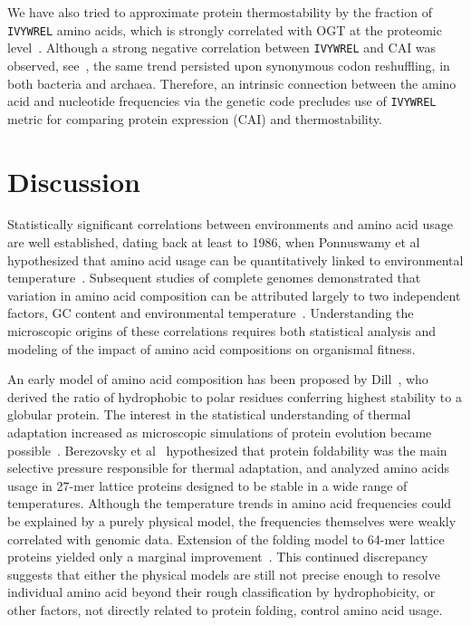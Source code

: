 \documentclass[10pt,letterpaper]{article}
\begin{document}
We have also tried to approximate protein thermostability by the fraction of \texttt{IVYWREL} amino acids, which is strongly correlated with OGT at the proteomic level~\cite{Zeldovich2007Protein}. Although a strong negative correlation between \texttt{IVYWREL} and CAI was observed, see~, the same trend persisted upon synonymous codon reshuffling, in both bacteria and archaea. Therefore, an intrinsic connection between the amino acid and nucleotide frequencies via the genetic code precludes use of \texttt{IVYWREL} metric for comparing protein expression (CAI) and thermostability.

\section*{Discussion}


Statistically significant correlations between environments and amino acid usage are well established, dating back at least to 1986, when Ponnuswamy et al hypothesized that amino acid usage can be quantitatively linked to environmental temperature~\cite{Ponnuswamy1986Amino}. Subsequent studies of complete genomes demonstrated that variation in amino acid composition can be attributed largely to two independent factors,  GC content and environmental  temperature~\cite{Kreil2001Identification,Singer2003Thermophilic}. Understanding the microscopic origins of these correlations requires both statistical analysis and modeling of the impact of amino acid compositions on organismal fitness. 

An early model of amino acid composition has been proposed by Dill~\cite{Dill1985Theory}, who derived the ratio of hydrophobic to polar residues conferring highest stability to a globular protein. The interest in the statistical understanding of thermal adaptation increased as microscopic simulations of protein evolution became possible~\cite{Taverna2002Why,Bloom2006Protein,Goldstein2008The}. Berezovsky et al~\cite{Berezovsky2007Positive} hypothesized that protein foldability was the main selective pressure responsible for thermal adaptation, and analyzed amino acids usage in 27-mer lattice proteins designed to be stable in a wide range of temperatures. Although the temperature trends in amino acid frequencies could be explained by a purely physical model, the frequencies themselves were weakly correlated with genomic data. Extension of the folding model to 64-mer lattice proteins yielded only a marginal improvement~\cite{Venev2015Massively}. This continued discrepancy suggests that either the physical models are still not precise enough to resolve individual amino acid  beyond their rough classification by hydrophobicity, or other factors, not directly related to protein folding, control amino acid usage.
\end{document}
